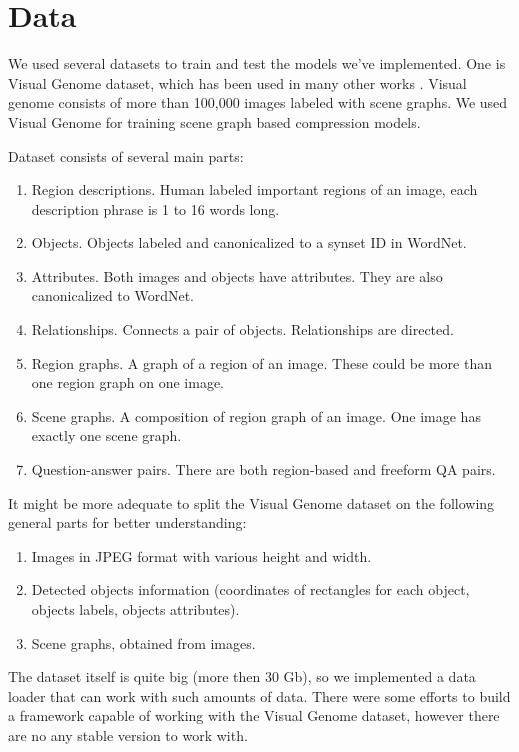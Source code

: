 \chapter{Data}
\label{section:data}

We used several datasets to train and test the models we've implemented. One is Visual Genome dataset, which has been used in many other works \cite{Krishna_Zhu_Groth_Johnson_Hata_Kravitz_Chen_Kalantidis_Li_Shamma_etal_2016}. Visual genome consists of more than 100,000 images labeled with scene graphs. We used Visual Genome for training scene graph based compression models.

Dataset consists of several main parts:

\begin{enumerate}
    \item Region descriptions. Human labeled important regions of an image, each description phrase is 1 to 16 words long.
    \item Objects. Objects labeled and canonicalized to a synset ID in WordNet.
    \item Attributes. Both images and objects have attributes. They are also canonicalized to WordNet.
    \item Relationships. Connects a pair of objects. Relationships are directed.
    \item Region graphs. A graph of a region of an image. These could be more than one region graph on one image.
    \item Scene graphs. A composition of region graph of an image. One image has exactly one scene graph.
    \item Question-answer pairs. There are both region-based and freeform QA pairs.
\end{enumerate}

It might be more adequate to split the Visual Genome dataset on the following general parts for better understanding:

\begin{enumerate}
    \item Images in JPEG format with various height and width.
    \item Detected objects information (coordinates of rectangles for each object, objects labels, objects attributes).
    \item Scene graphs, obtained from images.
\end{enumerate}

The dataset itself is quite big (more then 30 Gb), so we implemented a data loader that can work with such amounts of data. There were some efforts \cite{Yang_2018_Graph} to build a framework capable of working with the Visual Genome dataset, however there are no any stable version to work with.

